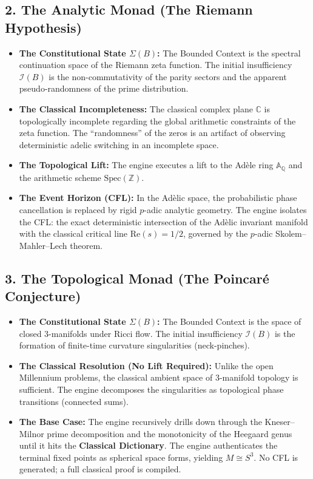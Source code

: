 \documentclass[12pt,openany]{extbook}
\theoremstyle{plain}
\theoremstyle{definition}
\begin{document}
\subsection*{2. The Analytic Monad (The Riemann Hypothesis)}
\begin{itemize}
    \item \textbf{The Constitutional State $\Sigma(B)$:} The Bounded Context is the spectral continuation space of the Riemann zeta function. The initial insufficiency $\mathcal{I}(B)$ is the non-commutativity of the parity sectors and the apparent pseudo-randomness of the prime distribution.
    \item \textbf{The Classical Incompleteness:} The classical complex plane $\mathbb{C}$ is topologically incomplete regarding the global arithmetic constraints of the zeta function. The ``randomness'' of the zeros is an artifact of observing deterministic adelic switching in an incomplete space.
    \item \textbf{The Topological Lift:} The engine executes a lift to the Ad\`ele ring $\mathbb{A}_{\mathbb{Q}}$ and the arithmetic scheme $\mathrm{Spec}(\mathbb{Z})$.
    \item \textbf{The Event Horizon (CFL):} In the Ad\`elic space, the probabilistic phase cancellation is replaced by rigid $p$-adic analytic geometry. The engine isolates the CFL: the exact deterministic intersection of the Ad\`elic invariant manifold with the classical critical line $\mathrm{Re}(s) = 1/2$, governed by the $p$-adic Skolem--Mahler--Lech theorem.
\end{itemize}

\subsection*{3. The Topological Monad (The Poincar\'e Conjecture)}
\begin{itemize}
    \item \textbf{The Constitutional State $\Sigma(B)$:} The Bounded Context is the space of closed $3$-manifolds under Ricci flow. The initial insufficiency $\mathcal{I}(B)$ is the formation of finite-time curvature singularities (neck-pinches).
    \item \textbf{The Classical Resolution (No Lift Required):} Unlike the open Millennium problems, the classical ambient space of $3$-manifold topology is sufficient. The engine decomposes the singularities as topological phase transitions (connected sums).
    \item \textbf{The Base Case:} The engine recursively drills down through the Kneser--Milnor prime decomposition and the monotonicity of the Heegaard genus until it hits the \textbf{Classical Dictionary}. The engine authenticates the terminal fixed points as spherical space forms, yielding $M \cong S^3$. No CFL is generated; a full classical proof is compiled.
\end{itemize}
\end{document}
